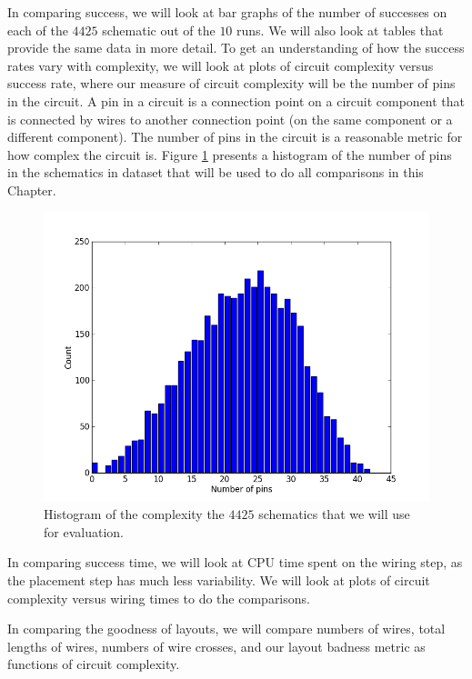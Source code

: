 In comparing success, we will look at bar graphs of the number of successes on
each of the $4425$ schematic out of the $10$ runs. We will also look at tables
that provide the same data in more detail. To get an understanding of how the
success rates vary with complexity, we will look at plots of circuit complexity
versus success rate, where our measure of circuit complexity will be the number
of pins in the circuit. A pin in a circuit is a connection point on a circuit
component that is connected by wires to another connection point (on the same
component or a different component). The number of pins in the circuit is
a reasonable metric for how complex the circuit is. Figure
\ref{fig:complexity_hist} presents a histogram of the number of pins in the
schematics in dataset that will be used to do all comparisons in this Chapter.

\begin{figure}[H]
\begin{center}
\includegraphics[width=\textwidth]{Images/complexity_hist.png}
\caption{Histogram of the complexity the $4425$ schematics that we will use for
evaluation.}
\label{fig:complexity_hist}
\end{center}
\end{figure}

In comparing success time, we will look at CPU time spent on the wiring step, as
the placement step has much less variability. We will look at plots of circuit
complexity versus wiring times to do the comparisons.

In comparing the goodness of layouts, we will compare numbers of wires, total
lengths of wires, numbers of wire crosses, and our layout badness metric as
functions of circuit complexity.

